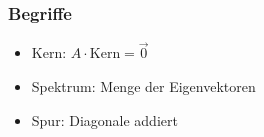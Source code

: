 \subsubsection{Begriffe}
\begin{itemize}
    \item Kern: $A \cdot \text{Kern} = \vec{0}$
    \item Spektrum: Menge der Eigenvektoren
    \item Spur: Diagonale addiert
\end{itemize}